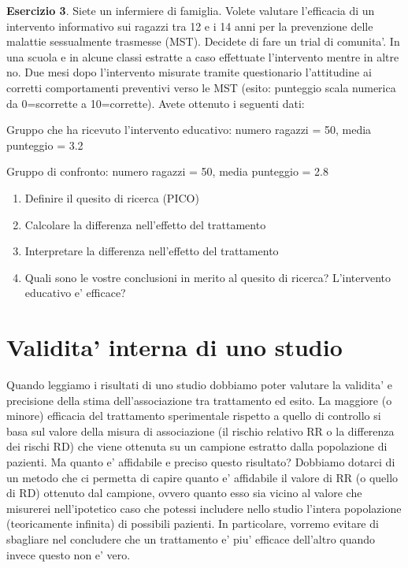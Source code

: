 \documentclass[]{book}
\begin{document}
\textbf{Esercizio 3}. Siete un infermiere di famiglia. Volete valutare l'efficacia di un intervento informativo sui ragazzi tra 12 e i 14 anni per la prevenzione delle malattie sessualmente trasmesse (MST). Decidete di fare un trial di comunita'. In una scuola e in alcune classi estratte a caso effettuate l'intervento mentre in altre no. Due mesi dopo l'intervento misurate tramite questionario l'attitudine ai corretti comportamenti preventivi verso le MST (esito: punteggio scala numerica da 0=scorrette a 10=corrette). Avete ottenuto i seguenti dati:

Gruppo che ha ricevuto l'intervento educativo: numero ragazzi = 50, media punteggio = 3.2

Gruppo di confronto: numero ragazzi = 50, media punteggio = 2.8

\begin{enumerate}
\def\labelenumi{\arabic{enumi})}
\item
  Definire il quesito di ricerca (PICO)
\item
  Calcolare la differenza nell'effetto del trattamento
\item
  Interpretare la differenza nell'effetto del trattamento
\item
  Quali sono le vostre conclusioni in merito al quesito di ricerca? L'intervento educativo e' efficace?
\end{enumerate}

\hypertarget{validita-interna-di-uno-studio}{%
\section{Validita' interna di uno studio}\label{validita-interna-di-uno-studio}}

Quando leggiamo i risultati di uno studio dobbiamo poter valutare la validita' e precisione della stima dell'associazione tra trattamento ed esito. La maggiore (o minore) efficacia del trattamento sperimentale rispetto a quello di controllo si basa sul valore della misura di associazione (il rischio relativo RR o la differenza dei rischi RD) che viene ottenuta su un campione estratto dalla popolazione di pazienti. Ma quanto e' affidabile e preciso questo risultato? Dobbiamo dotarci di un metodo che ci permetta di capire quanto e' affidabile il valore di RR (o quello di RD) ottenuto dal campione, ovvero quanto esso sia vicino al valore che misurerei nell'ipotetico caso che potessi includere nello studio l'intera popolazione (teoricamente infinita) di possibili pazienti. In particolare, vorremo evitare di sbagliare nel concludere che un trattamento e' piu' efficace dell'altro quando invece questo non e' vero.
\end{document}
